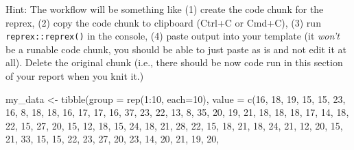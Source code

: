 \documentclass[
  openany]{book}
\newenvironment{Shaded}{\begin{snugshade}}{\end{snugshade}}
\newcommand{\AttributeTok}[1]{\textcolor[rgb]{0.77,0.63,0.00}{#1}}
\newcommand{\DecValTok}[1]{\textcolor[rgb]{0.00,0.00,0.81}{#1}}
\newcommand{\FunctionTok}[1]{\textcolor[rgb]{0.00,0.00,0.00}{#1}}
\newcommand{\NormalTok}[1]{#1}
\newcommand{\OtherTok}[1]{\textcolor[rgb]{0.56,0.35,0.01}{#1}}
\newcommand{\SpecialCharTok}[1]{\textcolor[rgb]{0.00,0.00,0.00}{#1}}
\begin{document}
Hint: The workflow will be something like (1) create the code chunk for the reprex, (2) copy the code chunk to clipboard (Ctrl+C or Cmd+C), (3) run \texttt{reprex::reprex()} in the console, (4) paste output into your template (it \emph{won't} be a runable code chunk, you should be able to just paste as is and not edit it at all). Delete the original chunk (i.e., there should be now code run in this section of your report when you knit it.)

\begin{Shaded}
\begin{Highlighting}[]
\NormalTok{my\_data }\OtherTok{\textless{}{-}} \FunctionTok{tibble}\NormalTok{(}\AttributeTok{group =} \FunctionTok{rep}\NormalTok{(}\DecValTok{1}\SpecialCharTok{:}\DecValTok{10}\NormalTok{, }\AttributeTok{each=}\DecValTok{10}\NormalTok{), }
                  \AttributeTok{value =} \FunctionTok{c}\NormalTok{(}\DecValTok{16}\NormalTok{, }\DecValTok{18}\NormalTok{, }\DecValTok{19}\NormalTok{, }\DecValTok{15}\NormalTok{, }\DecValTok{15}\NormalTok{, }\DecValTok{23}\NormalTok{, }\DecValTok{16}\NormalTok{, }\DecValTok{8}\NormalTok{, }\DecValTok{18}\NormalTok{, }\DecValTok{18}\NormalTok{, }\DecValTok{16}\NormalTok{, }\DecValTok{17}\NormalTok{, }\DecValTok{17}\NormalTok{, }
                            \DecValTok{16}\NormalTok{, }\DecValTok{37}\NormalTok{, }\DecValTok{23}\NormalTok{, }\DecValTok{22}\NormalTok{, }\DecValTok{13}\NormalTok{, }\DecValTok{8}\NormalTok{, }\DecValTok{35}\NormalTok{, }\DecValTok{20}\NormalTok{, }\DecValTok{19}\NormalTok{, }\DecValTok{21}\NormalTok{, }\DecValTok{18}\NormalTok{, }\DecValTok{18}\NormalTok{, }\DecValTok{18}\NormalTok{, }
                            \DecValTok{17}\NormalTok{, }\DecValTok{14}\NormalTok{, }\DecValTok{18}\NormalTok{, }\DecValTok{22}\NormalTok{, }\DecValTok{15}\NormalTok{, }\DecValTok{27}\NormalTok{, }\DecValTok{20}\NormalTok{, }\DecValTok{15}\NormalTok{, }\DecValTok{12}\NormalTok{, }\DecValTok{18}\NormalTok{, }\DecValTok{15}\NormalTok{, }\DecValTok{24}\NormalTok{, }\DecValTok{18}\NormalTok{, }
                            \DecValTok{21}\NormalTok{, }\DecValTok{28}\NormalTok{, }\DecValTok{22}\NormalTok{, }\DecValTok{15}\NormalTok{, }\DecValTok{18}\NormalTok{, }\DecValTok{21}\NormalTok{, }\DecValTok{18}\NormalTok{, }\DecValTok{24}\NormalTok{, }\DecValTok{21}\NormalTok{, }\DecValTok{12}\NormalTok{, }\DecValTok{20}\NormalTok{, }\DecValTok{15}\NormalTok{, }\DecValTok{21}\NormalTok{, }
                            \DecValTok{33}\NormalTok{, }\DecValTok{15}\NormalTok{, }\DecValTok{15}\NormalTok{, }\DecValTok{22}\NormalTok{, }\DecValTok{23}\NormalTok{, }\DecValTok{27}\NormalTok{, }\DecValTok{20}\NormalTok{, }\DecValTok{23}\NormalTok{, }\DecValTok{14}\NormalTok{, }\DecValTok{20}\NormalTok{, }\DecValTok{21}\NormalTok{, }\DecValTok{19}\NormalTok{, }\DecValTok{20}\NormalTok{, }

\end{Highlighting}
\end{Shaded}
\end{document}
